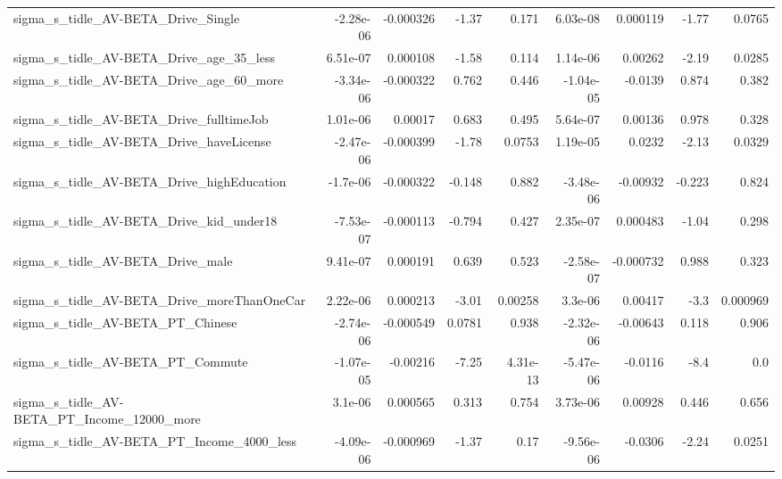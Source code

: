 \begin{tabular}{lrrrrrrrr}
sigma\_s\_tidle\_AV-BETA\_Drive\_Single                 &   -2.28e-06 &    -0.000326 &     -1.37 &    0.171 &   6.03e-08 &    0.000119 &        -1.77 &        0.0765 \\
sigma\_s\_tidle\_AV-BETA\_Drive\_age\_35\_less            &    6.51e-07 &     0.000108 &     -1.58 &    0.114 &   1.14e-06 &     0.00262 &        -2.19 &        0.0285 \\
sigma\_s\_tidle\_AV-BETA\_Drive\_age\_60\_more            &   -3.34e-06 &    -0.000322 &     0.762 &    0.446 &  -1.04e-05 &     -0.0139 &        0.874 &         0.382 \\
sigma\_s\_tidle\_AV-BETA\_Drive\_fulltimeJob            &    1.01e-06 &      0.00017 &     0.683 &    0.495 &   5.64e-07 &     0.00136 &        0.978 &         0.328 \\
sigma\_s\_tidle\_AV-BETA\_Drive\_haveLicense            &   -2.47e-06 &    -0.000399 &     -1.78 &   0.0753 &   1.19e-05 &      0.0232 &        -2.13 &        0.0329 \\
sigma\_s\_tidle\_AV-BETA\_Drive\_highEducation          &    -1.7e-06 &    -0.000322 &    -0.148 &    0.882 &  -3.48e-06 &    -0.00932 &       -0.223 &         0.824 \\
sigma\_s\_tidle\_AV-BETA\_Drive\_kid\_under18            &   -7.53e-07 &    -0.000113 &    -0.794 &    0.427 &   2.35e-07 &    0.000483 &        -1.04 &         0.298 \\
sigma\_s\_tidle\_AV-BETA\_Drive\_male                   &    9.41e-07 &     0.000191 &     0.639 &    0.523 &  -2.58e-07 &   -0.000732 &        0.988 &         0.323 \\
sigma\_s\_tidle\_AV-BETA\_Drive\_moreThanOneCar         &    2.22e-06 &     0.000213 &     -3.01 &  0.00258 &    3.3e-06 &     0.00417 &         -3.3 &      0.000969 \\
sigma\_s\_tidle\_AV-BETA\_PT\_Chinese                   &   -2.74e-06 &    -0.000549 &    0.0781 &    0.938 &  -2.32e-06 &    -0.00643 &        0.118 &         0.906 \\
sigma\_s\_tidle\_AV-BETA\_PT\_Commute                   &   -1.07e-05 &     -0.00216 &     -7.25 & 4.31e-13 &  -5.47e-06 &     -0.0116 &         -8.4 &           0.0 \\
sigma\_s\_tidle\_AV-BETA\_PT\_Income\_12000\_more         &     3.1e-06 &     0.000565 &     0.313 &    0.754 &   3.73e-06 &     0.00928 &        0.446 &         0.656 \\
sigma\_s\_tidle\_AV-BETA\_PT\_Income\_4000\_less          &   -4.09e-06 &    -0.000969 &     -1.37 &     0.17 &  -9.56e-06 &     -0.0306 &        -2.24 &        0.0251 \\

\end{tabular}
